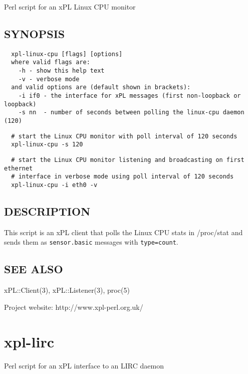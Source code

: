 \documentclass[12pt,a4paper]{article}
\begin{document}
Perl script for an xPL Linux CPU monitor

\subsection*{SYNOPSIS\label{xpl-linux-cpu_SYNOPSIS}}
\begin{verbatim}
  xpl-linux-cpu [flags] [options]
  where valid flags are:
    -h - show this help text
    -v - verbose mode
  and valid options are (default shown in brackets):
    -i if0 - the interface for xPL messages (first non-loopback or loopback)
    -s nn  - number of seconds between polling the linux-cpu daemon (120)
\end{verbatim}
\begin{verbatim}
  # start the Linux CPU monitor with poll interval of 120 seconds
  xpl-linux-cpu -s 120
\end{verbatim}
\begin{verbatim}
  # start the Linux CPU monitor listening and broadcasting on first ethernet
  # interface in verbose mode using poll interval of 120 seconds
  xpl-linux-cpu -i eth0 -v
\end{verbatim}
\subsection*{DESCRIPTION\label{xpl-linux-cpu_DESCRIPTION}}


This script is an xPL client that polls the Linux CPU stats in /proc/stat
and sends them as \texttt{sensor.basic} messages with \texttt{type=count}.

\subsection*{SEE ALSO\label{xpl-linux-cpu_SEE_ALSO}}


xPL::Client(3), xPL::Listener(3), proc(5)



Project website: http://www.xpl-perl.org.uk/

\newpage
\section{xpl-lirc\label{xpl-lirc}}


Perl script for an xPL interface to an LIRC daemon
\end{document}
